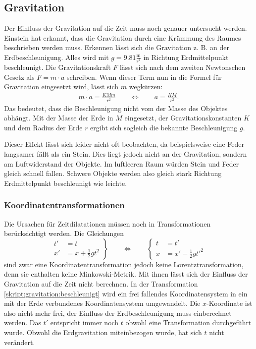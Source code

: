 \begin{refsection}
\subsection{Gravitation} \label{Gravitation}
	Der Einfluss der Gravitation auf die Zeit muss noch genauer untersucht werden. Einstein hat erkannt, dass die Gravitation durch eine Krümmung des Raumes beschrieben werden muss. Erkennen lässt sich die Gravitation z. B. an der Erdbeschleunigung. Alles wird mit $g=9.81\frac{\text{m}}{\text{s}^2}$ in Richtung Erdmittelpunkt beschleunigt. Die Gravitationskraft $F$ lässt sich nach dem zweiten Newtonschen Gesetz als $F=m\cdot a$ schreiben. Wenn dieser Term nun in die Formel für Gravitation eingesetzt wird, lässt sich $m$ wegkürzen: 
	\begin{align*}
		m\cdot a = \frac{KMm}{r^2} \qquad\Leftrightarrow\qquad a=\frac{KM}{r^2}.
	\end{align*}
    Das bedeutet, dass die Beschleunigung nicht vom der Masse des Objektes abhängt. Mit der Masse der Erde in $M$ eingesetzt, der Gravitationskonstanten $K$ und dem Radius der Erde $r$ ergibt sich sogleich die bekannte Beschleunigung $g$.
    
	Dieser Effekt lässt sich leider nicht oft beobachten, da beispielsweise eine Feder langsamer fällt als ein Stein. Dies liegt jedoch nicht an der Gravitation, sondern am Luftwiderstand der Objekte. Im luftleeren Raum würden Stein und Feder gleich schnell fallen. Schwere Objekte werden also gleich stark Richtung Erdmittelpunkt beschleunigt wie leichte.
	
	\subsubsection{Koordinatentransformationen}
    Die Ursachen für Zeitdilatationen müssen noch in Transformationen berücksichtigt werden. 
	Die Gleichungen 
	\begin{equation}\label{skript:gravitation:beschleunigt}
	\left.
	\begin{aligned}
	t'&=t\\
	x'&=x+\frac12gt^2
	\end{aligned}
	\right\}
	\qquad
	\Leftrightarrow
	\qquad
	\left\{
	\begin{aligned}
	t&=t'\\
	x&=x'-\frac12gt'^2
	\end{aligned}
	\right.
	\end{equation}
    sind zwar eine Koordinatentransformation jedoch keine Lorentztransformation, denn sie enthalten keine Minkowski-Metrik. Mit ihnen lässt sich der Einfluss der Gravitation auf die Zeit nicht berechnen. 
    In der Transformation \eqref{skript:gravitation:beschleunigt} wird ein frei fallendes Koordinatensystem in ein mit der Erde verbundenes Koordinatensystem umgewandelt. Die $x$-Koordinate ist also nicht mehr frei, der Einfluss der Erdbeschleunigung muss einberechnet werden.
	Das $t'$ entspricht immer noch $t$ obwohl eine Transformation durchgeführt wurde. Obwohl die Erdgravitation miteinbezogen wurde, hat sich $t$ nicht verändert.
	

\end{refsection}
